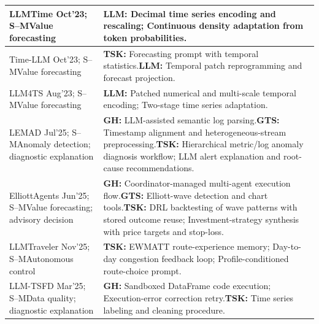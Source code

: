 \documentclass[preprints,article,submit,moreauthors]{Definitions/mdpi}
\newcommand{\typeSMshort}{\textsf{S--M}}
\begin{document}
\begin{longtable}{@{}>{\raggedright\arraybackslash}p{}p{}@{}}
LLMTime \citep{gruver2023llmtime} Oct'23; \typeSMshort{}\newline Value forecasting & \textbf{LLM:} Decimal time series encoding and rescaling; Continuous density adaptation from token probabilities.\\\midrule
Time-LLM \citep{jin2024timellm} Oct'23; \typeSMshort{}\newline Value forecasting & \textbf{TSK:} Forecasting prompt with temporal statistics.\newline\textbf{LLM:} Temporal patch reprogramming and forecast projection.\\\midrule
LLM4TS \citep{chang2024llm4ts} Aug'23; \typeSMshort{}\newline Value forecasting & \textbf{LLM:} Patched numerical and multi-scale temporal encoding; Two-stage time series adaptation.\\\midrule
LEMAD \citep{ji2025lemad} Jul'25; \typeSMshort{}\newline Anomaly detection; diagnostic explanation & \textbf{GH:} LLM-assisted semantic log parsing.\newline\textbf{GTS:} Timestamp alignment and heterogeneous-stream preprocessing.\newline\textbf{TSK:} Hierarchical metric/log anomaly diagnosis workflow; LLM alert explanation and root-cause recommendations.\\\midrule
ElliottAgents \citep{wawer2025integrating} Jun'25; \typeSMshort{}\newline Value forecasting; advisory decision & \textbf{GH:} Coordinator-managed multi-agent execution flow.\newline\textbf{GTS:} Elliott-wave detection and chart tools.\newline\textbf{TSK:} DRL backtesting of wave patterns with stored outcome reuse; Investment-strategy synthesis with price targets and stop-loss.\\\midrule
LLMTraveler \citep{wang2025agentic} Nov'25; \typeSMshort{}\newline Autonomous control & \textbf{TSK:} EWMATT route-experience memory; Day-to-day congestion feedback loop; Profile-conditioned route-choice prompt.\\\midrule
LLM-TSFD \citep{zhang2025llm} Mar'25; \typeSMshort{}\newline Data quality; diagnostic explanation & \textbf{GH:} Sandboxed DataFrame code execution; Execution-error correction retry.\newline\textbf{TSK:} Time series labeling and cleaning procedure.\\\midrule

\end{longtable}
\end{document}
